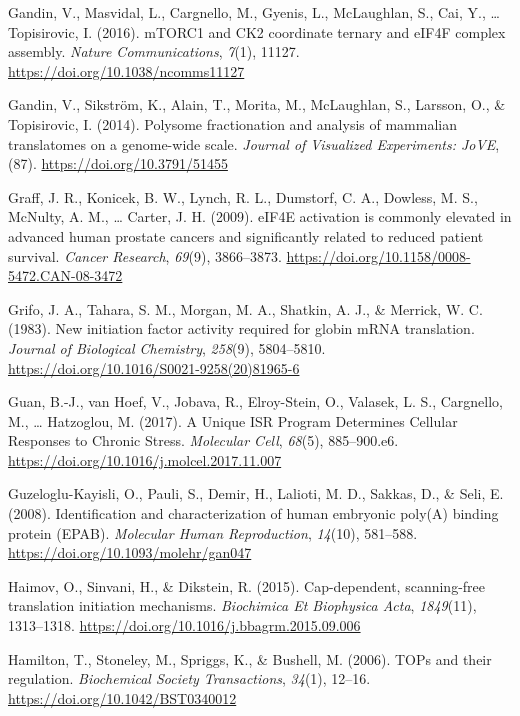\documentclass[12pt,openany]{book}
\begin{document}
\hypertarget{ref-Gandin2016}{}
Gandin, V., Masvidal, L., Cargnello, M., Gyenis, L., McLaughlan, S.,
Cai, Y., \ldots{} Topisirovic, I. (2016). mTORC1 and CK2 coordinate
ternary and eIF4F complex assembly. \emph{Nature Communications},
\emph{7}(1), 11127. \url{https://doi.org/10.1038/ncomms11127}

\hypertarget{ref-Gandin2014}{}
Gandin, V., Sikström, K., Alain, T., Morita, M., McLaughlan, S.,
Larsson, O., \& Topisirovic, I. (2014). Polysome fractionation and
analysis of mammalian translatomes on a genome-wide scale. \emph{Journal
of Visualized Experiments: JoVE}, (87).
\url{https://doi.org/10.3791/51455}

\hypertarget{ref-Graff2009}{}
Graff, J. R., Konicek, B. W., Lynch, R. L., Dumstorf, C. A., Dowless, M.
S., McNulty, A. M., \ldots{} Carter, J. H. (2009). eIF4E activation is
commonly elevated in advanced human prostate cancers and significantly
related to reduced patient survival. \emph{Cancer Research},
\emph{69}(9), 3866--3873.
\url{https://doi.org/10.1158/0008-5472.CAN-08-3472}

\hypertarget{ref-Grifo1983}{}
Grifo, J. A., Tahara, S. M., Morgan, M. A., Shatkin, A. J., \& Merrick,
W. C. (1983). New initiation factor activity required for globin mRNA
translation. \emph{Journal of Biological Chemistry}, \emph{258}(9),
5804--5810. \url{https://doi.org/10.1016/S0021-9258(20)81965-6}

\hypertarget{ref-Guan2017}{}
Guan, B.-J., van Hoef, V., Jobava, R., Elroy-Stein, O., Valasek, L. S.,
Cargnello, M., \ldots{} Hatzoglou, M. (2017). A Unique ISR Program
Determines Cellular Responses to Chronic Stress. \emph{Molecular Cell},
\emph{68}(5), 885--900.e6.
\url{https://doi.org/10.1016/j.molcel.2017.11.007}

\hypertarget{ref-Guzeloglu-Kayisli2008}{}
Guzeloglu-Kayisli, O., Pauli, S., Demir, H., Lalioti, M. D., Sakkas, D.,
\& Seli, E. (2008). Identification and characterization of human
embryonic poly(A) binding protein (EPAB). \emph{Molecular Human
Reproduction}, \emph{14}(10), 581--588.
\url{https://doi.org/10.1093/molehr/gan047}

\hypertarget{ref-Haimov2015}{}
Haimov, O., Sinvani, H., \& Dikstein, R. (2015). Cap-dependent,
scanning-free translation initiation mechanisms. \emph{Biochimica Et
Biophysica Acta}, \emph{1849}(11), 1313--1318.
\url{https://doi.org/10.1016/j.bbagrm.2015.09.006}

\hypertarget{ref-Hamilton2006}{}
Hamilton, T., Stoneley, M., Spriggs, K., \& Bushell, M. (2006). TOPs and
their regulation. \emph{Biochemical Society Transactions}, \emph{34}(1),
12--16. \url{https://doi.org/10.1042/BST0340012}
\end{document}

